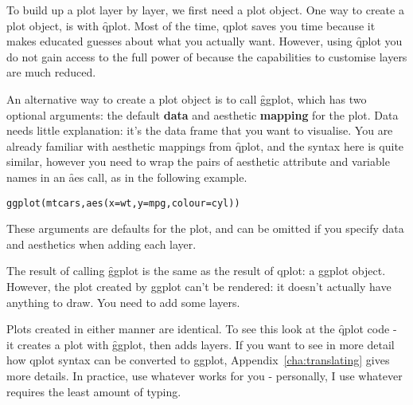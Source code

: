 To build up a plot layer by layer, we first need a plot object.  One way to create a plot object, is with \f{qplot}.  Most of the time, qplot saves you time because it makes educated guesses about what you actually want.  However, using \f{qplot} you do not gain access to the full power of \ggplot because the capabilities to customise layers are much reduced.


An alternative way to create a plot object is to call \f{ggplot}, which has two optional arguments: the default {\bf data} and aesthetic {\bf mapping} for the plot.  Data needs little explanation: it's the data frame that you want to visualise.  You are already familiar with aesthetic mappings from \f{qplot}, and the syntax here is quite similar, however you need to wrap the pairs of aesthetic attribute and variable names in an \f{aes} call, as in the following example.

\begin{alltt}
  ggplot(mtcars, aes(x = wt, y = mpg, colour = cyl))
\end{alltt}

These arguments are defaults for the plot, and can be omitted if you specify data and aesthetics when adding each layer.  

The result of calling \f{ggplot} is the same as the result of qplot: a ggplot object.  However, the plot created by ggplot can't be rendered: it doesn't actually have anything to draw.  You need to add some layers.

Plots created in either manner are identical.  To see this look at the \f{qplot} code - it creates a plot with \f{ggplot}, then adds layers.  If you want to see in more detail how qplot syntax can be converted to ggplot, Appendix~\ref{cha:translating} gives more details. In practice, use whatever works for you - personally, I use whatever requires the least amount of typing.

% 

